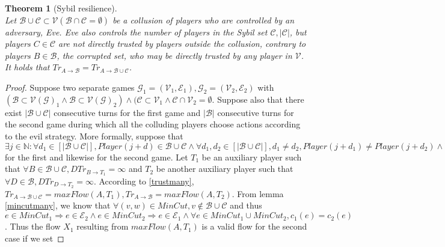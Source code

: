 \documentclass[11pt]{article}
\newtheorem{theorem}{Theorem}[section]
\theoremstyle{definition}
\theoremstyle{corollary}
\theoremstyle{lemma}
\begin{document}
    \begin{theorem}[Sybil resilience] \ \\
    \label{sybil}
       Let $\mathcal{B} \cup \mathcal{C} \subset \mathcal{V} (\mathcal{B} \cap \mathcal{C} = \emptyset)$ be a collusion of
       players who are controlled by an adversary, Eve. Eve also controls the number of players in the Sybil set
       $\mathcal{C}, |\mathcal{C}|$, but players $C \in \mathcal{C}$ are not directly trusted by players outside the
       collusion, contrary to players $B \in \mathcal{B}$, the corrupted set, who may be directly trusted by any player in
       $\mathcal{V}$. It holds that $Tr_{A \rightarrow \mathcal{B}} = Tr_{A \rightarrow \mathcal{B} \cup \mathcal{C}}$.
    \end{theorem}
    \begin{proof}
       Suppose two separate games $\mathcal{G}_1 = (\mathcal{V}_1,\mathcal{E}_1), \mathcal{G}_2 = (\mathcal{V}_2,
       \mathcal{E}_2)$ with $(\mathcal{B} \subset \mathcal{V(G)}_1 \wedge \mathcal{B} \subset \mathcal{V(G)}_2) \wedge
       (\mathcal{C} \subset \mathcal{V}_1 \wedge \mathcal{C} \cap \mathcal{V}_2 = \emptyset$. Suppose also that there exist
       $|\mathcal{B} \cup \mathcal{C}|$ consecutive turns for the first game and $|\mathcal{B}|$ consecutive turns for the
       second game during which all the colluding players choose actions according to the evil strategy. More formally,
       suppose that $\exists j \in \mathbb{N} : \forall d_1 \in [|\mathcal{B} \cup \mathcal{C}|], Player(j+d) \in
       \mathcal{B} \cup \mathcal{C} \wedge \forall d_1, d_2 \in [|\mathcal{B} \cup \mathcal{C}|], d_1 \neq d_2, Player(j +
       d_1) \neq Player(j + d_2) \wedge \forall d \in [|\mathcal{B} \cup \mathcal{C}|], Strategy(Player(j+d)) = Evil$ for the
       first and likewise for the second game. Let $T_1$ be an auxiliary player such that $\forall B \in \mathcal{B} \cup
       \mathcal{C}, DTr_{B \rightarrow T_1} = \infty$ and $T_2$ be another auxiliary player such that $\forall D \in
       \mathcal{B}, DTr_{D \rightarrow T_2} = \infty$. According to \ref{trustmany}, $Tr_{A \rightarrow \mathcal{B} \cup
       \mathcal{C}} = maxFlow(A, T_1), Tr_{A \rightarrow \mathcal{B}} = maxFlow(A, T_2)$. From lemma \ref{mincutmany}, we
       know that $\forall (v,w) \in MinCut, v \notin \mathcal{B} \cup \mathcal{C}$ and thus $e \in MinCut_1 \Rightarrow e \in
       \mathcal{E}_2 \wedge e \in MinCut_2 \Rightarrow e \in \mathcal{E}_1 \wedge \forall e \in MinCut_1 \cup MinCut_2,
       c_1(e) = c_2(e)$. Thus the flow $X_1$ resulting from $maxFlow(A, T_1)$ is a valid flow for the second case if we set

\end{proof}
\end{document}
